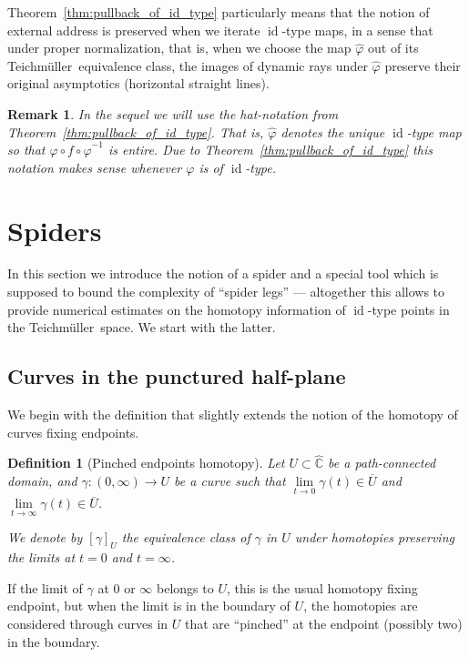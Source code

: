 \documentclass[10pt,reqno,a4paper]{amsart}
\numberwithin{figure}{section}
\numberwithin{equation}{section}
\newtheorem{defn}[thm]{Definition}
\newtheorem{remark}[thm]{Remark}
\newcommand{\tei}{Teichm\"uller}
\newcommand{\idt}{of $\id$-type}
\newcommand{\id}{\operatorname{id}}
\begin{document}
Theorem~\ref{thm:pullback_of_id_type} particularly means that the notion of external address is preserved when we iterate $\id$-type maps, in a sense that under proper normalization, that is, when we choose the map $\hat{\varphi}$ out of its \tei\ equivalence class, the images of dynamic rays under $\hat{\varphi}$ preserve their original asymptotics (horizontal straight lines). 

\begin{remark}
	In the sequel we will use the hat-notation from Theorem~\ref{thm:pullback_of_id_type}. That is, $\hat{\varphi}$ denotes the unique $\id$-type map so that $\varphi\circ f\circ\hat{\varphi}^{-1}$ is entire. Due to Theorem~\ref{thm:pullback_of_id_type} this notation makes sense whenever $\varphi$ is \idt.	
\end{remark}

\section{Spiders}
\label{sec:spiders}

In this section we introduce the notion of a spider and a special tool which is supposed to bound the complexity of ``spider legs'' --- altogether this allows to provide numerical estimates on the homotopy information of $\id$-type points in the \tei\ space. We start with the latter.

\subsection{Curves in the punctured half-plane}
\label{subsec:r_curves}

We begin with the definition that slightly extends the notion of the homotopy of curves fixing endpoints.

\begin{defn}[Pinched endpoints homotopy]
	\label{defn:pinched_endpts_homotopy}
	Let $U\subset\hat{\mathbb{C}}$ be a path-connected domain, and $\gamma:(0,\infty)\to U$ be a curve such that $\lim\limits_{t\to 0}\gamma(t)\in \overline{U}$ and $\lim\limits_{t\to\infty}\gamma(t)\in\overline{U}$.
	
	We denote by $[\gamma]_U$ the equivalence class of $\gamma$ in $U$ under homotopies preserving the limits at $t=0$ and $t=\infty$. 
\end{defn}

If the limit of $\gamma$ at $0$ or $\infty$ belongs to $U$, this is the usual homotopy fixing endpoint, but when the limit is in the boundary of $U$, the homotopies are considered through curves in $U$ that are ``pinched'' at the endpoint (possibly two) in the boundary.
\end{document}
